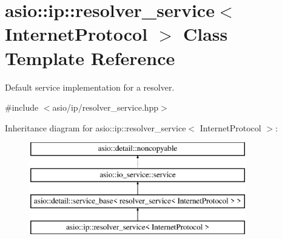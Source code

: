 \hypertarget{classasio_1_1ip_1_1resolver__service}{}\section{asio\+:\+:ip\+:\+:resolver\+\_\+service$<$ Internet\+Protocol $>$ Class Template Reference}
\label{classasio_1_1ip_1_1resolver__service}


Default service implementation for a resolver.  




{\ttfamily \#include $<$asio/ip/resolver\+\_\+service.\+hpp$>$}

Inheritance diagram for asio\+:\+:ip\+:\+:resolver\+\_\+service$<$ Internet\+Protocol $>$\+:\begin{figure}[H]
\begin{center}
\leavevmode
\includegraphics[height=4.000000cm]{classasio_1_1ip_1_1resolver__service}
\end{center}
\end{figure}
